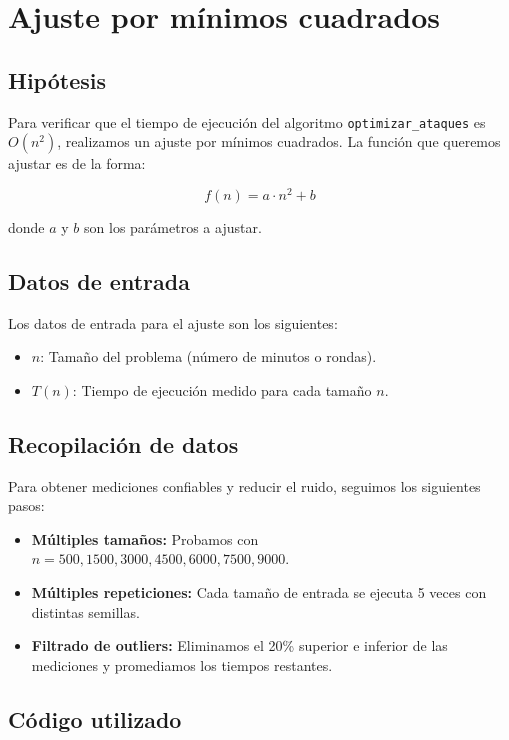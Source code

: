 \section{Ajuste por mínimos cuadrados}

\subsection{Hipótesis}

Para verificar que el tiempo de ejecución del algoritmo \texttt{optimizar\_ataques} es $O(n^2)$, realizamos un ajuste por mínimos cuadrados. La función que queremos ajustar es de la forma:

\[
f(n) = a \cdot n^2 + b
\]

donde $a$ y $b$ son los parámetros a ajustar.

\subsection{Datos de entrada}

Los datos de entrada para el ajuste son los siguientes:

\begin{itemize}
    \item $n$: Tamaño del problema (número de minutos o rondas).
    \item $T(n)$: Tiempo de ejecución medido para cada tamaño $n$.
\end{itemize}

\subsection{Recopilación de datos}

Para obtener mediciones confiables y reducir el ruido, seguimos los siguientes pasos:

\begin{itemize}
    \item \textbf{Múltiples tamaños:} Probamos con $n = 500, 1500, 3000, 4500, 6000, 7500, 9000$.
    \item \textbf{Múltiples repeticiones:} Cada tamaño de entrada se ejecuta 5 veces con distintas semillas.
    \item \textbf{Filtrado de outliers:} Eliminamos el 20\% superior e inferior de las mediciones y promediamos los tiempos restantes.
\end{itemize}

\subsection{Código utilizado}

